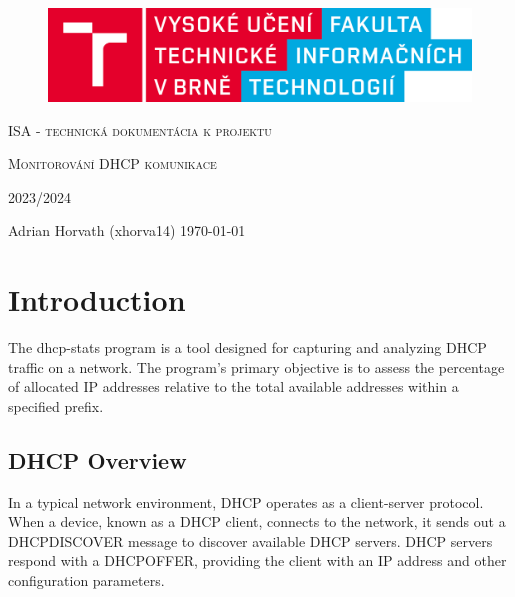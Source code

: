 \documentclass[a4paper]{article}
\begin{document}
\begin{titlepage}
\begin{center}
    
\begin{figure}[h]
    \centering
    \includegraphics[width=15cm]{fit_logo_1.png}
\end{figure}
    


\bigskip
\bigskip
\bigskip
\bigskip
\bigskip
\bigskip
\bigskip



{\Huge \textsc{ISA - technická dokumentácia k projektu}\par}

\bigskip
{\Huge \textsc{Monitorování DHCP komunikace}\par}

\bigskip
\Huge 2023/2024
\bigskip
\bigskip
\bigskip
\bigskip


\bigskip
\bigskip
\bigskip
\bigskip
\bigskip
\bigskip
\bigskip
    
    
\end{center}
    
\Large  
            Adrian Horvath  (xhorva14)
\hfill \today
\end{titlepage}

\tableofcontents

\newpage

\section{Introduction}
The dhcp-stats program is a tool designed for capturing and analyzing DHCP traffic on a network. The program's primary objective is to assess the percentage of allocated IP addresses relative to the total available addresses within a specified prefix. 

\subsection{DHCP Overview}

In a typical network environment, DHCP operates as a client-server protocol. When a device, known as a DHCP client, connects to the network, it sends out a DHCPDISCOVER message to discover available DHCP servers. DHCP servers respond with a DHCPOFFER, providing the client with an IP address and other configuration parameters.
\end{document}
